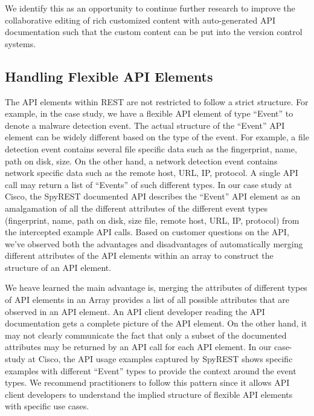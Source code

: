 \documentclass[10pt, conference]{IEEEtran}
\begin{document}
We identify this as an opportunity to continue further research to improve the collaborative editing of rich customized content with auto-generated API documentation such that the custom content can be put into the version control systems.

\subsection{Handling Flexible API Elements}
The API elements within REST are not restricted to follow a strict structure. For example, in the case study, we have a flexible API element of type ``Event'' to denote a malware detection event. The actual structure of the ``Event'' API element can be widely different based on the type of the event. For example, a file detection event contains several file specific data such as the fingerprint, name, path on disk, size. On the other hand, a network detection event contains network specific data such as the remote host, URL, IP, protocol. A single API call may return a list of ``Events'' of such different types. In our case study at Cisco, the SpyREST documented API describes the ``Event'' API element as an amalgamation of all the different attributes of the different event types (fingerprint, name, path on disk, size file, remote host, URL, IP, protocol) from the intercepted example API calls. Based on customer questions on the API, we've observed both the advantages and disadvantages of automatically merging different attributes of the API elements within an array to construct the structure of an API element.

We heave learned the main advantage is, merging the attributes of different types of API elements in an Array provides a list of all possible attributes that are observed in an API element. An API client developer reading the API documentation gets a complete picture of the API element. On the other hand, it may not clearly communicate the fact that only a subset of the documented attributes may be returned by an API call for each API element. In our case-study at Cisco, the API usage examples captured by SpyREST shows specific examples with different ``Event'' types to provide the context around the event types. We recommend practitioners to follow this pattern since it allows API client developers to understand the implied structure of flexible API elements with specific use cases.
\end{document}
